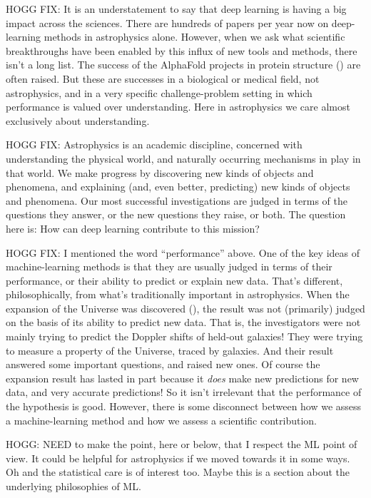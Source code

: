 \documentclass[11pt]{article}
\begin{document}
HOGG FIX: It is an understatement to say that deep learning is having a big impact across the sciences.
There are hundreds of papers per year now on deep-learning methods in astrophysics alone.
However, when we ask what scientific breakthroughs have been enabled by this influx of new tools and methods, there isn't a long list.
The success of the AlphaFold projects in protein structure (\cite{alphafold}) are often raised.
But these are successes in a biological or medical field, not astrophysics, and in a very specific challenge-problem setting in which performance is valued over understanding.
Here in astrophysics we care almost exclusively about understanding.

HOGG FIX: Astrophysics is an academic discipline, concerned with understanding the physical world, and naturally occurring mechanisms in play in that world.
We make progress by discovering new kinds of objects and phenomena, and explaining (and, even better, predicting) new kinds of objects and phenomena.
Our most successful investigations are judged in terms of the questions they answer, or the new questions they raise, or both.
The question here is: How can deep learning contribute to this mission?

HOGG FIX: I mentioned the word ``performance'' above.
One of the key ideas of machine-learning methods is that they are usually judged in terms of their performance, or their ability to predict or explain new data.
That's different, philosophically, from what's traditionally important in astrophysics.
When the expansion of the Universe was discovered (\cite{expansion, expansion2}), the result was not (primarily) judged on the basis of its ability to predict new data.
That is, the investigators were not mainly trying to predict the Doppler shifts of held-out galaxies!
They were trying to measure a property of the Universe, traced by galaxies.
And their result answered some important questions, and raised new ones.
Of course the expansion result has lasted in part because it \emph{does} make new predictions for new data, and very accurate predictions!
So it isn't irrelevant that the performance of the hypothesis is good.
However, there is some disconnect between how we assess a machine-learning method and how we assess a scientific contribution.

HOGG: NEED to make the point, here or below, that I respect the ML point of view. It could be helpful for astrophysics if we moved towards it in some ways. Oh and the statistical care is of interest too. Maybe this is a section about the underlying philosophies of ML.
\end{document}
